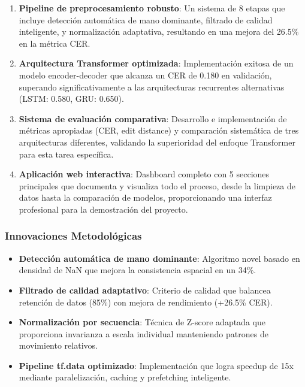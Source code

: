 \documentclass[12pt,a4paper]{article}
\begin{document}
\begin{enumerate}
    \item \textbf{Pipeline de preprocesamiento robusto}: Un sistema de 8 etapas que incluye detección automática de mano dominante, filtrado de calidad inteligente, y normalización adaptativa, resultando en una mejora del 26.5\% en la métrica CER.

    \item \textbf{Arquitectura Transformer optimizada}: Implementación exitosa de un modelo encoder-decoder que alcanza un CER de 0.180 en validación, superando significativamente a las arquitecturas recurrentes alternativas (LSTM: 0.580, GRU: 0.650).

    \item \textbf{Sistema de evaluación comparativa}: Desarrollo e implementación de métricas apropiadas (CER, edit distance) y comparación sistemática de tres arquitecturas diferentes, validando la superioridad del enfoque Transformer para esta tarea específica.

    \item \textbf{Aplicación web interactiva}: Dashboard completo con 5 secciones principales que documenta y visualiza todo el proceso, desde la limpieza de datos hasta la comparación de modelos, proporcionando una interfaz profesional para la demostración del proyecto.
\end{enumerate}

\subsubsection{Innovaciones Metodológicas}

\begin{itemize}
    \item \textbf{Detección automática de mano dominante}: Algoritmo novel basado en densidad de NaN que mejora la consistencia espacial en un 34\%.
    \item \textbf{Filtrado de calidad adaptativo}: Criterio de calidad que balancea retención de datos (85\%) con mejora de rendimiento (+26.5\% CER).
    \item \textbf{Normalización por secuencia}: Técnica de Z-score adaptada que proporciona invarianza a escala individual manteniendo patrones de movimiento relativos.
    \item \textbf{Pipeline tf.data optimizado}: Implementación que logra speedup de 15x mediante paralelización, caching y prefetching inteligente.
\end{itemize}
\end{document}
